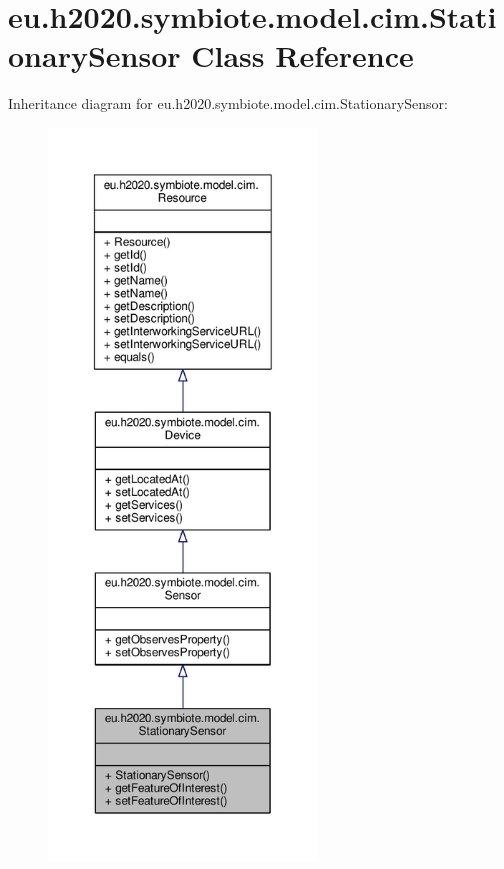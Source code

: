 \hypertarget{classeu_1_1h2020_1_1symbiote_1_1model_1_1cim_1_1StationarySensor}{}\section{eu.\+h2020.\+symbiote.\+model.\+cim.\+Stationary\+Sensor Class Reference}
\label{classeu_1_1h2020_1_1symbiote_1_1model_1_1cim_1_1StationarySensor}


Inheritance diagram for eu.\+h2020.\+symbiote.\+model.\+cim.\+Stationary\+Sensor\+:
\nopagebreak
\begin{figure}[H]
\begin{center}
\leavevmode
\includegraphics[height=550pt]{classeu_1_1h2020_1_1symbiote_1_1model_1_1cim_1_1StationarySensor__inherit__graph}
\end{center}
\end{figure}


